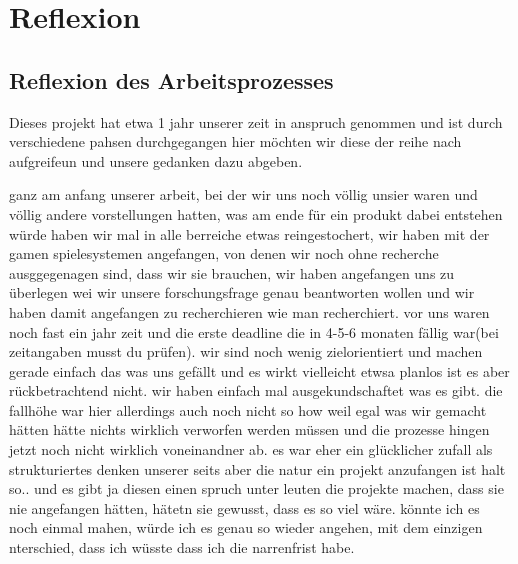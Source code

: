 \documentclass[../Main.tex]{subfiles}
\begin{document}
\section{Reflexion} \label{sec:Reflexion}

\subsection{Reflexion des Arbeitsprozesses}

Dieses projekt hat etwa 1 jahr unserer zeit in anspruch genommen und ist durch verschiedene pahsen durchgegangen hier möchten wir diese der reihe nach aufgreifeun und unsere gedanken dazu abgeben.

ganz am anfang unserer arbeit, bei der wir uns noch völlig unsier waren und völlig andere vorstellungen hatten, was am ende für ein produkt dabei entstehen würde haben wir mal in alle berreiche etwas reingestochert, wir haben mit der gamen spielesystemen angefangen, von denen wir noch ohne recherche ausggegenagen sind, dass wir sie brauchen, wir haben angefangen uns zu überlegen wei wir unsere forschungsfrage genau beantworten wollen und wir haben damit angefangen zu recherchieren wie man recherchiert. vor uns waren noch fast ein jahr zeit und die erste deadline die in 4-5-6 monaten fällig war(bei zeitangaben musst du prüfen). wir sind noch wenig zielorientiert und machen gerade einfach das was uns gefällt und es wirkt vielleicht etwsa planlos ist es aber rückbetrachtend nicht. wir haben einfach mal ausgekundschaftet was es gibt. die fallhöhe war hier allerdings auch noch nicht so how weil egal was wir gemacht hätten hätte nichts wirklich verworfen werden müssen und die prozesse hingen jetzt noch nicht wirklich voneinandner ab. es war eher ein glücklicher zufall als strukturiertes denken unserer seits aber die natur ein projekt anzufangen ist halt so.. und es gibt ja diesen einen spruch unter leuten die projekte machen, dass sie nie angefangen hätten, hätetn sie gewusst, dass es so viel wäre. könnte ich es noch einmal mahen, würde ich es genau so wieder angehen, mit dem einzigen nterschied, dass ich wüsste dass ich die narrenfrist habe.
\end{document}
